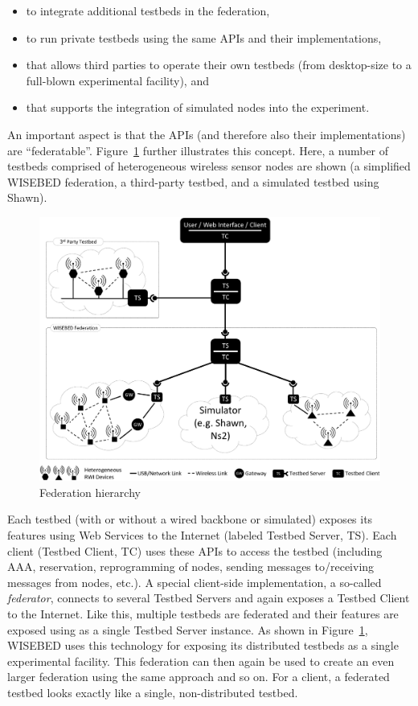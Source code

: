 \documentclass[a4paper,11pt]{article}
\begin{document}
\begin{itemize}
	\item to integrate additional testbeds in the federation, 
	\item to run private testbeds using the same APIs and their implementations,
	\item that allows third parties to operate their own testbeds (from desktop-size to a full-blown experimental facility), and 
	\item that supports the integration of simulated nodes into the experiment. 
\end{itemize}

An important aspect is that the APIs (and therefore also their implementations) are ``federatable''. Figure~\ref{fig:federation} further illustrates this concept. Here, a number of testbeds comprised of heterogeneous wireless sensor nodes are shown (a simplified WISEBED federation, a third-party testbed, and a simulated testbed using Shawn). 

 \begin{figure}[htb]
      \begin{center}
      \includegraphics[width=.9\textwidth]{fig/federation}
      \caption{Federation hierarchy}
      \label{fig:federation}
      \end{center}
\end{figure}

Each testbed (with or without a wired backbone or simulated) exposes its features using Web Services to the Internet (labeled Testbed Server, TS). Each client (Testbed Client, TC) uses these APIs to access the testbed (including AAA, reservation, reprogramming of nodes, sending messages to/receiving messages from nodes, etc.). A special client-side implementation, a so-called \emph{federator}, connects to several Testbed Servers and again exposes a Testbed Client to the Internet. Like this, multiple testbeds are federated and their features are exposed using as a single Testbed Server instance. As shown in Figure~\ref{fig:federation}, WISEBED uses this technology for exposing its distributed testbeds as a single experimental facility. This federation can then again be used to create an even larger federation using the same approach and so on. For a client, a federated testbed looks exactly like a single, non-distributed testbed. 
\end{document}
